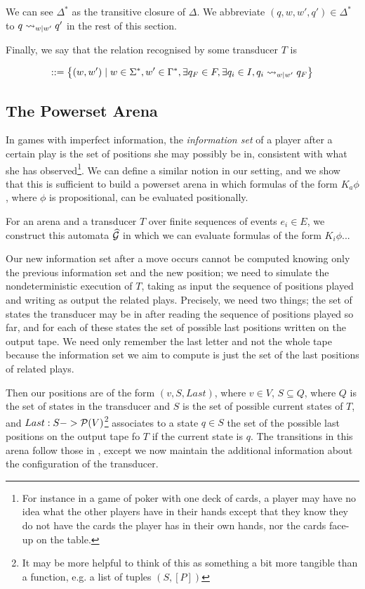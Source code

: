 \documentclass[10pt, a4paper]{report}
\begin{document}
We can see $\Delta^\ast$ as the transitive closure of $\Delta$. We abbreviate
$(q, w, w', q') \in \Delta^\ast$ to $q \rightsquigarrow_{w \mid w'} q'$ in the rest of
this section.

Finally, we say that the relation recognised by some transducer $T$ is

\begin{align*}
  [T] ::= \left\{ (w, w') \mid w \in \Sigma^\ast, w' \in \Gamma^\ast, \exists q_F \in F, \exists q_i \in I, q_i \rsarrow_{w \mid w'} q_F \right\}
\end{align*}

\subsection{The Powerset Arena}
\label{sec:PowersetArena}

In games with imperfect information, the \emph{information set} of a player after a
certain play is the set of positions she may possibly be in, consistent with
what she has observed\footnote{For instance in a game of poker with one deck of cards, a
player may have no idea what the other players have in their hands except that
they know they do not have the cards the player has in their own hands, nor the
cards face-up on the table.}. We can define a similar notion in our setting, and
we show that this is sufficient to build a powerset arena in which formulas of
the form $K_a \phi$, where $\phi$ is propositional, can be evaluated positionally. 

For an arena  and a transducer $T$ over finite sequences of events $e_i \in
E$, we construct this automata $\widehat{\mathcal{G}}$ in which we can evaluate
formulas of the form $K_i \phi$... 

Our new information set after a move occurs cannot be computed knowing only the
previous information set and the new position; we need to simulate the
nondeterministic execution of $T$, taking as input the sequence of positions
played and writing as output the related plays. Precisely, we need two things;
the set of states the transducer may be in after reading the sequence of
positions played so far, and for each of these states the set of possible last
positions written on the output tape. We need only remember the last letter and
not the whole tape because the information set we aim to compute is just the set
of the last positions of related plays.

Then our positions are of the form $(v, S, Last)$, where $v \in V$, $S \subseteq
Q$, where $Q$ is the set of states in the transducer and $S$ is the set of
possible current states of $T$, and $Last : S -> \mathcal{P}(V)$\footnote{It may be
  more helpful to think of this as something a bit more tangible than a
  function, e.g. a list of tuples $(S, [P])$} associates to a state $q \in S$
the set of the possible last positions on the output tape fo $T$ if the current
state is $q$. The transitions in this arena follow those in , except we
now maintain the additional information about the configuration of the
transducer.
\end{document}
